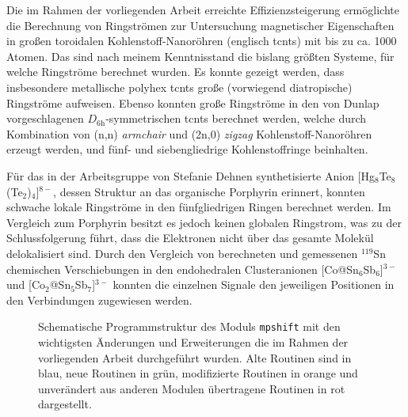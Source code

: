 \bigskip
Die im Rahmen der vorliegenden Arbeit erreichte Effizienzsteigerung ermöglichte die Berechnung von Ringströmen zur Untersuchung magnetischer Eigenschaften in großen toroidalen Kohlenstoff-Nanoröhren (englisch \acfp{tcnt}) mit bis zu ca. 1000 Atomen. Das sind nach meinem Kenntnisstand die bislang größten Systeme, für welche Ringströme berechnet wurden. Es konnte gezeigt werden, dass insbesondere metallische polyhex \acp{tcnt} große (vorwiegend diatropische) Ringströme aufweisen. Ebenso konnten große Ringströme in den von Dunlap vorgeschlagenen $D_{\text{6h}}$-symmetrischen \acp{tcnt} berechnet werden, welche durch Kombination von (n,n) \textit{armchair} und (2n,0) \textit{zigzag} Kohlenstoff-Nanoröhren erzeugt werden, und fünf- und siebengliedrige Kohlenstoffringe beinhalten.

Für das in der Arbeitsgruppe von Stefanie Dehnen synthetisierte Anion [Hg$_8$Te$_8$(Te$_2$)$_4$]$^{8-}$, dessen Struktur an das organische Porphyrin erinnert, konnten schwache lokale Ringströme in den fünfgliedrigen Ringen berechnet werden. Im Vergleich zum Porphyrin besitzt es jedoch keinen globalen Ringstrom, was zu der Schlussfolgerung führt, dass die Elektronen nicht über das gesamte Molekül delokalisiert sind.
Durch den Vergleich von berechneten und gemessenen $^{119}$Sn chemischen Verschiebungen in den endohedralen Clusteranionen [Co@Sn$_6$Sb$_6$]$^{3-}$ und [Co$_2$@Sn$_5$Sb$_7$]$^{3-}$
konnten die einzelnen Signale den jeweiligen Positionen in den Verbindungen zugewiesen werden.

\begin{figure}[ht!]
	\centering
	\captionsetup{figurewithin = chapter}
	\captionsetup{font=small, labelfont=bf}\caption[Neue schematische Programmstruktur des Moduls \texttt{mpshift}]{Schematische Programmstruktur des Moduls \texttt{mpshift} mit den wichtigsten Änderungen und Erweiterungen die im Rahmen der vorliegenden Arbeit durchgeführt wurden. Alte Routinen sind in blau, neue Routinen in grün, modifizierte Routinen in orange und unverändert aus anderen Modulen übertragene Routinen in rot dargestellt.}
\label{abb:neue_programmstruktur}
\end{figure}

